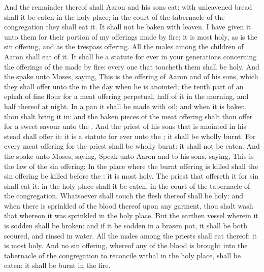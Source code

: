 \begin{biblechapter}
\verse And the remainder thereof shall Aaron and his sons eat: with unleavened bread shall it be eaten in the holy place; in the court of the tabernacle of the congregation they shall eat it.
\verse It shall not be baken with leaven. I have given it unto them for their portion of my offerings made by fire; it is most holy, as is the sin offering, and as the trespass offering.
\verse All the males among the children of Aaron shall eat of it. It shall be a statute for ever in your generations concerning the offerings of the \LORD made by fire: every one that toucheth them shall be holy.
\verse And the \LORD spake unto Moses, saying,
\verse This is the offering of Aaron and of his sons, which they shall offer unto the \LORD in the day when he is anointed; the tenth part of an ephah of fine flour for a meat offering perpetual, half of it in the morning, and half thereof at night.
\verse In a pan it shall be made with oil; and when it is baken, thou shalt bring it in: and the baken pieces of the meat offering shalt thou offer for a sweet savour unto the \LORD.
\verse And the priest of his sons that is anointed in his stead shall offer it: it is a statute for ever unto the \LORD; it shall be wholly burnt.
\verse For every meat offering for the priest shall be wholly burnt: it shall not be eaten.
 And the \LORD spake unto Moses, saying,
\verse Speak unto Aaron and to his sons, saying, This is the law of the sin offering: In the place where the burnt offering is killed shall the sin offering be killed before the \LORD: it is most holy.
\verse The priest that offereth it for sin shall eat it: in the holy place shall it be eaten, in the court of the tabernacle of the congregation.
\verse Whatsoever shall touch the flesh thereof shall be holy: and when there is sprinkled of the blood thereof upon any garment, thou shalt wash that whereon it was sprinkled in the holy place.
\verse But the earthen vessel wherein it is sodden shall be broken: and if it be sodden in a brasen pot, it shall be both scoured, and rinsed in water.
\verse All the males among the priests shall eat thereof: it is most holy.
\verse And no sin offering, whereof any of the blood is brought into the tabernacle of the congregation to reconcile withal in the holy place, shall be eaten: it shall be burnt in the fire.
\end{biblechapter}

